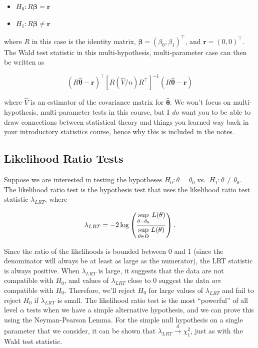 \documentclass[
  letterpaper,
  DIV=11,
  numbers=noendperiod]{scrreprt}
\begin{document}
\begin{itemize}
\item
  \(H_0: R \boldsymbol{\beta} = \textbf{r}\)
\item
  \(H_1: R \boldsymbol{\beta} \neq \textbf{r}\)
\end{itemize}

where \(R\) in this case is the identity matrix,
\(\boldsymbol{\beta} = (\beta_0, \beta_1)^\top\), and
\(\textbf{r} = (0,0)^\top\). The Wald test statistic in this
multi-hypothesis, multi-parameter case can then be written as

\[
(R\hat{\boldsymbol{\theta}} - \textbf{r})^\top [R (\hat{V}/n) R^\top]^{-1} (R\hat{\boldsymbol{\theta}} - \textbf{r})
\]

where \(\hat{V}\) is an estimator of the covariance matrix for
\(\hat{\boldsymbol{\theta}}\). We won't focus on multi-hypothesis,
multi-parameter tests in this course, but I \emph{do} want you to be
able to draw connections between statistical theory and things you
learned way back in your introductory statistics course, hence why this
is included in the notes.

\subsection*{Likelihood Ratio Tests}\label{likelihood-ratio-tests}

Suppose we are interested in testing the hypotheses
\(H_0: \theta = \theta_0\) vs.~\(H_1: \theta \neq \theta_0\). The
likelihood ratio test is the hypothesis test that uses the likelihood
ratio test statistic \(\lambda_{LRT}\), where

\[
\lambda_{LRT} = -2 \log\left(\frac{\underset{\theta = \theta_0}{\text{sup}} \hspace{1mm} L(\theta)}{\underset{\theta \in \Theta}{\text{sup}} \hspace{1mm} L(\theta)} \right).
\]

Since the ratio of the likelihoods is bounded between 0 and 1 (since the
denominator will always be at least as large as the numerator), the LRT
statistic is always positive. When \(\lambda_{LRT}\) is large, it
suggests that the data are not compatible with \(H_0\), and values of
\(\lambda_{LRT}\) close to \(0\) suggest the data \emph{are} compatible
with \(H_0\). Therefore, we'll reject \(H_0\) for large values of
\(\lambda_{LRT}\) and fail to reject \(H_0\) if \(\lambda_{LRT}\) is
small. The likelihood ratio test is the most ``powerful'' of all level
\(\alpha\) tests when we have a simple alternative hypothesis, and we
can prove this using the Neyman-Pearson Lemma. For the simple null
hypothesis on a single parameter that we consider, it can be shown that
\(\lambda_{LRT} \overset{d}{\to} \chi^2_1\), just as with the Wald test
statistic.
\end{document}
